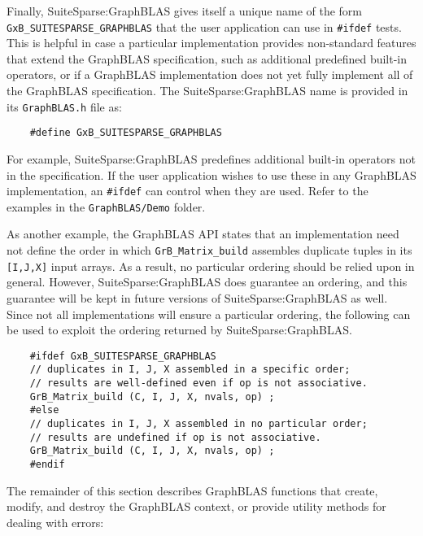 \documentclass[12pt]{article}
\begin{document}
Finally, SuiteSparse:GraphBLAS gives itself a unique name of the form
\verb'GxB_SUITESPARSE_GRAPHBLAS' that the user application can use in
\verb'#ifdef' tests. This is helpful in case a particular implementation
provides non-standard features that extend the GraphBLAS specification, such as
additional predefined built-in operators, or if a GraphBLAS implementation does
not yet fully implement all of the GraphBLAS specification.  The
SuiteSparse:GraphBLAS name is provided in its \verb'GraphBLAS.h' file as:

    {\footnotesize
    \begin{verbatim}
    #define GxB_SUITESPARSE_GRAPHBLAS \end{verbatim}}

For example, SuiteSparse:GraphBLAS predefines additional built-in operators not
in the specification.  If the user application wishes to use these in any
GraphBLAS implementation, an \verb'#ifdef' can control when they are used.
Refer to the examples in the \verb'GraphBLAS/Demo' folder.

As another example, the GraphBLAS API states that an
implementation need not define the order in which \verb'GrB_Matrix_build'
assembles duplicate tuples in its \verb'[I,J,X]' input arrays.  As a result, no
particular ordering should be relied upon in general.  However,
SuiteSparse:GraphBLAS does guarantee an ordering, and this guarantee will be
kept in future versions of SuiteSparse:GraphBLAS as well.  Since not all
implementations will ensure a particular ordering, the following can be used to
exploit the ordering returned by SuiteSparse:GraphBLAS.

    {\footnotesize
    \begin{verbatim}
    #ifdef GxB_SUITESPARSE_GRAPHBLAS
    // duplicates in I, J, X assembled in a specific order;
    // results are well-defined even if op is not associative.
    GrB_Matrix_build (C, I, J, X, nvals, op) ;
    #else
    // duplicates in I, J, X assembled in no particular order;
    // results are undefined if op is not associative.
    GrB_Matrix_build (C, I, J, X, nvals, op) ;
    #endif \end{verbatim}}

The remainder of this section describes GraphBLAS functions that create,
modify, and destroy the GraphBLAS context, or provide utility methods for
dealing with errors:
\end{document}
